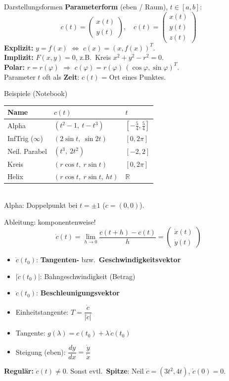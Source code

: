 \documentclass[a4paper, fontsize=7pt]{scrartcl}
\def\R{\mathbb{R}}  %
\renewcommand*{\arraystretch}{1.5}  %
\begin{document}
\begin{mainbox}{Darstellungsformen}
\textbf{Parameterform} (eben / Raum), $t \in [a, b]$:
$$c(t) = \begin{pmatrix} x(t) \\ y(t) \end{pmatrix}, \quad
c(t) = \begin{pmatrix} x(t) \\ y(t) \\ z(t) \end{pmatrix}$$
\textbf{Explizit:} $y = f(x)$ $\Leftrightarrow$ $c(x) = (x, f(x))^T$.\\
\textbf{Implizit:} $F(x, y) = 0$, z.B.\ Kreis $x^2 + y^2 - r^2 = 0$.\\
\textbf{Polar:} $r = r(\varphi)$ $\Rightarrow$
$c(\varphi) = r(\varphi)\,(\cos\varphi, \sin\varphi)^T$.\\
Parameter $t$ oft als \textbf{Zeit}: $c(t)$ = Ort eines Punktes.
\end{mainbox}

\begin{subbox}{Beispiele (Notebook)}
\renewcommand*{\arraystretch}{1.4}
\setlength{\tabcolsep}{3pt}
\begin{tabular}{@{}l|l|l@{}}
\textbf{Name} & $c(t)$ & $t$ \\
\hline
Alpha & $(t^2 - 1,\ t - t^3)$ & $[-\frac{5}{4}, \frac{5}{4}]$ \\
InfTrig ($\infty$) & $(2\sin t,\ \sin 2t)$ & $[0, 2\pi]$ \\
Neil. Parabel & $(t^3,\ 2t^2)$ & $[-2, 2]$ \\
Kreis & $(r\cos t,\ r\sin t)$ & $[0, 2\pi]$ \\
Helix & $(r\cos t,\ r\sin t,\ ht)$ & $\R$ \\
\end{tabular}\\[2pt]
Alpha: Doppelpunkt bei $t = \pm 1$ ($c = (0, 0)$).
\end{subbox}

\begin{mainbox}{Ableitung: komponentenweise!}
$$\dot c(t) = \lim_{h \to 0} \frac{c(t + h) - c(t)}{h}
= \begin{pmatrix} \dot x(t) \\ \dot y(t) \end{pmatrix}$$
\begin{itemize}
    \item $\dot c(t_0)$: \textbf{Tangenten-} bzw.\ \textbf{Geschwindigkeitsvektor}
    \item $|\dot c(t_0)|$: Bahngeschwindigkeit (Betrag)
    \item $\ddot c(t_0)$: \textbf{Beschleunigungsvektor}
    \item Einheitstangente: $T = \dfrac{\dot c}{|\dot c|}$
    \item Tangente: $g(\lambda) = c(t_0) + \lambda\, \dot c(t_0)$
    \item Steigung (eben): $\dfrac{dy}{dx} = \dfrac{\dot y}{\dot x}$
\end{itemize}
\textbf{Regulär:} $\dot c(t) \ne 0$. Sonst evtl.\ \textbf{Spitze}: Neil
$\dot c = (3t^2, 4t)$, $\dot c(0) = 0$.
\end{mainbox}
\end{document}
